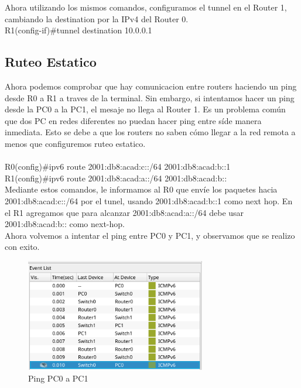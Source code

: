 \documentclass[a4paper,12pt]{article}
\begin{document}
Ahora utilizando los mismos comandos, configuramos el tunnel en el Router 1, cambiando la destination por la IPv4 del Router 0.\\
R1(config-if)\#tunnel destination 10.0.0.1\\

\subsection{Ruteo Estatico}
Ahora podemos comprobar que hay comunicacion entre routers haciendo un ping desde R0 a R1 a traves de la terminal. Sin embargo, si intentamos hacer un ping desde la PC0 a la PC1, el mesaje no llega al Router 1. Es un problema común que dos PC en redes diferentes no puedan hacer ping entre síde manera inmediata. Esto se debe a que los routers no saben cómo llegar a la red remota a menos que configuremos ruteo estatico.\\
\noindent\\
R0(config)\#ipv6 route 2001:db8:acad:c::/64 2001:db8:acad:b::1\\
R1(config)\#ipv6 route 2001:db8:acad:a::/64 2001:db8:acad:b::\\

Mediante estos comandos, le informamos al R0 que envíe los paquetes hacia 2001:db8:acad:c::/64 por el tunel, usando 2001:db8:acad:b::1 como next hop. En el R1 agregamos que para alcanzar 2001:db8:acad:a::/64 debe usar 2001:db8:acad:b:: como next-hop.\\

Ahora volvemos a intentar el ping entre PC0 y PC1, y observamos que se realizo con exito.\\

\begin{figure}[h]
    \centering
    \includegraphics[width=0.7\textwidth]{imagenes/success.png}
    \caption{Ping PC0 a PC1}
  \end{figure}
\FloatBarrier
\end{document}
